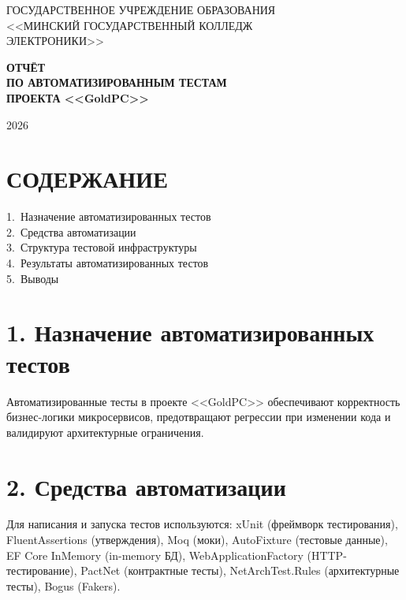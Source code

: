 \documentclass[12pt,a4paper]{article}
\begin{document}
\thispagestyle{empty}
\begin{center}
ГОСУДАРСТВЕННОЕ УЧРЕЖДЕНИЕ ОБРАЗОВАНИЯ\\
<<МИНСКИЙ ГОСУДАРСТВЕННЫЙ КОЛЛЕДЖ\\
ЭЛЕКТРОНИКИ>>
\end{center}

\vspace{3cm}

\begin{center}
{\bfseries ОТЧЁТ\\
ПО АВТОМАТИЗИРОВАННЫМ ТЕСТАМ\\
ПРОЕКТА <<GoldPC>>}
\end{center}

\vspace{2cm}

\begin{center}
2026
\end{center}

\vfill

\newpage

\section*{СОДЕРЖАНИЕ}

1.~Назначение автоматизированных тестов\\
2.~Средства автоматизации\\
3.~Структура тестовой инфраструктуры\\
4.~Результаты автоматизированных тестов\\
5.~Выводы

\newpage

\section{1. Назначение автоматизированных тестов}

Автоматизированные тесты в проекте <<GoldPC>> обеспечивают корректность бизнес-логики микросервисов, предотвращают регрессии при изменении кода и валидируют архитектурные ограничения.

\section{2. Средства автоматизации}

Для написания и запуска тестов используются: xUnit (фреймворк тестирования), FluentAssertions (утверждения), Moq (моки), AutoFixture (тестовые данные), EF Core InMemory (in-memory БД), WebApplicationFactory (HTTP-тестирование), PactNet (контрактные тесты), NetArchTest.Rules (архитектурные тесты), Bogus (Fakers).
\end{document}
